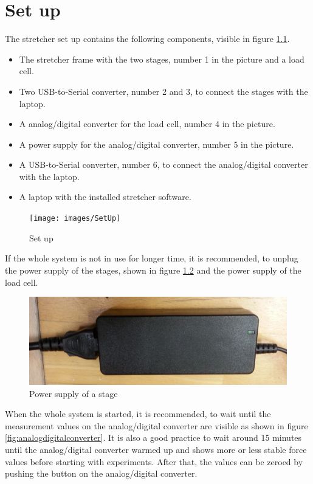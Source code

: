 \chapter{Set up}
The stretcher set up contains the following components, visible in figure \ref{fig:setup}.

\begin{itemize}
	\item The stretcher frame with the two stages, number 1 in the picture and a load cell.
	\item Two USB-to-Serial converter, number 2 and 3, to connect the stages with the laptop.
	\item A analog/digital converter for the load cell, number 4 in the picture.
	\item A power supply for the analog/digital converter, number 5 in the picture.
	\item A USB-to-Serial converter, number 6, to connect the analog/digital converter with the laptop.
	\item A laptop with the installed stretcher software.
\end{itemize}

\begin{figure}[!ht]
	\centering
		\texttt{[image: images/SetUp]}
	\caption{Set up}
	\label{fig:setup}
\end{figure}

If the whole system is not in use for longer time, it is recommended, to unplug the power supply of the stages, shown in figure \ref{fig:powersupply} and the power supply of the load cell.
\\

\begin{figure}[!ht]
	\centering
		\includegraphics[width=1.0\textwidth]{images/PowerSupply}
	\caption{Power supply of a stage}
	\label{fig:powersupply}
\end{figure}

When the whole system is started, it is recommended, to wait until the measurement values on the analog/digital converter are visible as shown in figure \ref{fig:analogdigitalconverter}. It is also a good practice to wait around 15 minutes until the analog/digital converter warmed up and shows more or less stable force values before starting with experiments. After that, the values can be zeroed by pushing the button on the analog/digital converter.

